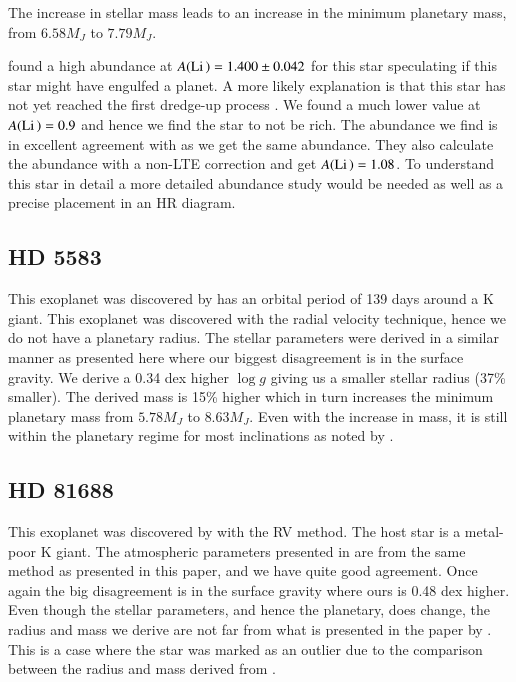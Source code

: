 \documentclass{aa}
\begin{document}
The increase in stellar mass leads to an increase in the minimum planetary mass,
from $6.58M_J$ to $7.79M_J$.

\citet{Nowak2013} found a high  abundance at
$A(\ion{Li}{})=1.400\pm0.042$ for this star speculating if this star might have
engulfed a planet. A more likely explanation is that this star has not yet
reached the first dredge-up process \citep{Nowak2013}. We found a much lower
value at $A(\ion{Li}{})=0.9$ and hence we find the star to not be 
rich. The  abundance we find is in excellent agreement with
\citet{Adamow2014} as we get the same abundance. They also calculate the
 abundance with a non-LTE correction and get $A(\ion{Li}{})=1.08$. To
understand this star in detail a more detailed abundance study would be needed
as well as a precise placement in an HR diagram.

\subsection{HD 5583}
\label{sub:HD_5583}
This exoplanet was discovered by \citet{Niedzielski2016} has an orbital period
of 139 days around a K giant. This exoplanet was discovered with the radial
velocity technique, hence we do not have a planetary radius. The stellar
parameters were derived in a similar manner as presented here
\citep[see][and references therein]{Niedzielski2016} where our biggest
disagreement is in the surface gravity. We derive a 0.34 dex higher $\log g$
giving us a smaller stellar radius (37\% smaller). The derived mass is 15\%
higher which in turn increases the minimum planetary mass from $5.78M_J$ to
$8.63M_J$. Even with the increase in mass, it is still within the planetary
regime for most inclinations as noted by \citet{Niedzielski2016}.



\subsection{HD 81688}
\label{sub:HD81688}
This exoplanet was discovered by \citet{Sato2008} with the RV method. The host
star is a metal-poor K giant. The atmospheric parameters presented in
\citet{Sato2008} are from the same method as presented in this paper, and we
have quite good agreement. Once again the big disagreement is in the surface
gravity where ours is 0.48 dex higher. Even though the stellar parameters, and
hence the planetary, does change, the radius and mass we derive are not far from
what is presented in the paper by \citet{Sato2008}. This is a case where the
star was marked as an outlier due to the comparison between the radius and mass
derived from \citet{Torres2010}.
\end{document}
